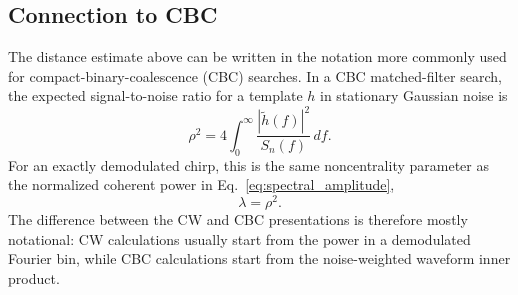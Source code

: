 \documentclass[aps,prd,amsmath,floats,floatfix, twocolumn,
superscriptaddress,nofootinbib,showpacs]{revtex4-2}
\begin{document}
\subsection{Connection to CBC}
\label{sec:connection_to_cbc}

The distance estimate above can be written in the notation more commonly used
for compact-binary-coalescence (CBC) searches.  In a CBC matched-filter search,
the expected signal-to-noise ratio for a template $h$ in stationary Gaussian
noise is
\begin{equation}
    \rho^2 = 4\int_0^\infty
    \frac{|\tilde h(f)|^2}{S_n(f)}\,df .
    \label{eq:cbc_snr}
\end{equation}
For an exactly demodulated chirp, this is the same noncentrality parameter as
the normalized coherent power in Eq.~\eqref{eq:spectral_amplitude},
\begin{equation}
    \lambda = \rho^2 .
    \label{eq:lambda_rho_equivalence}
\end{equation}
The difference between the CW and CBC presentations is therefore mostly
notational: CW calculations usually start from the power in a demodulated
Fourier bin, while CBC calculations start from the noise-weighted waveform
inner product.
\end{document}
